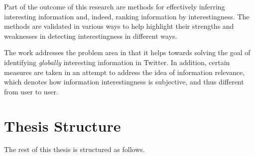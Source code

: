 Part of the outcome of this research are methods for effectively inferring interesting information and, indeed, ranking information by interestingness. The methods are validated in various ways to help highlight their strengths and weaknesses in detecting interestingness in different ways.

The work addresses the problem area in that it helps towards solving the goal of identifying \textit{globally} interesting information in Twitter. In addition, certain measures are taken in an attempt to address the idea of information relevance, which denotes how information interestingness is subjective, and thus different from user to user.


\section{Thesis Structure}
The rest of this thesis is structured as follows.

